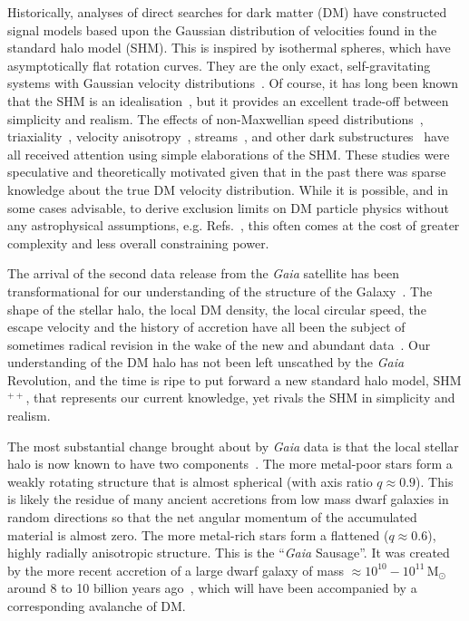 \documentclass[prd,10pt,twocolumn,showpacs,nofootinbib, aps,superscriptaddress,preprintnumbers]{revtex4-1}
\newcommand{\Msol}{\, \textrm{M}_\odot}
\begin{document}
Historically, analyses of direct searches for dark matter (DM) have
constructed signal models based upon the Gaussian distribution of
velocities found in the standard halo model (SHM). This is inspired by isothermal
spheres, which have asymptotically flat rotation curves. They are the
only exact, self-gravitating systems with Gaussian velocity
distributions~\cite{Chandra}. Of course, it has long been known that
the SHM is an
idealisation~\cite{Ev06,Vogelsberger:2008qb,Ze09,Ku10,Mao:2013nda},
but it provides an excellent trade-off between simplicity and
realism. The effects of non-Maxwellian speed
distributions~\cite{Kuhlen:2009vh,Ling:2009eh,Mao:2012hf},
triaxiality~\cite{Ca00}, velocity
anisotropy~\cite{Fairbairn:2008gz,Knirck:2018knd,MarchRussell:2008dy,Bozorgnia:2013pua,Fornasa:2013iaa},
streams~\cite{Savage:2006qr,Lee:2012pf,Purcell:2012sh,O'Hare:2014oxa,OHare:2017yze,Foster:2017hbq},
and other dark
substructures~\cite{Bruch:2008rx,Lisanti:2010qx,Lisanti:2011as,Billard:2012qu,Kavanagh:2016xfi}
have all received attention using simple elaborations of the
SHM. These studies were speculative and theoretically motivated given
that in the past there was sparse knowledge about the true DM velocity
distribution. While it is possible, and in some cases advisable, to
derive exclusion limits on DM particle physics without any
astrophysical assumptions, e.g. Refs.~\cite{Fox:2010bz, McCabe:2011sr,
  Frandsen:2011gi, Gondolo:2012rs, HerreroGarcia:2012fu,
  Frandsen:2013cna, Bozorgnia:2013hsa, Feldstein:2014gza,
  Fox:2014kua,Feldstein:2014ufa, Anderson:2015xaa,
  Gelmini:2016pei,Kahlhoefer:2016eds,Gondolo:2017jro,Gelmini:2017aqe,Ibarra:2017mzt,Fowlie:2017ufs},
this often comes at the cost of greater complexity and less
overall constraining power.

The arrival of the second data release from the {\it Gaia}
satellite has been transformational for our understanding of the
structure of the Galaxy~\cite{GaiaDR2}. The shape of the stellar halo,
the local DM density, the local circular speed, the escape velocity
and the history of accretion have all been the subject of sometimes
radical revision in the wake of the new and abundant
data~\cite{Lancaster:2018,We18,Be18}. Our understanding of the DM
halo has not been left unscathed by the \emph{Gaia} Revolution, and
the time is ripe to put forward a new standard halo model, SHM$^{++}$,
that represents our current knowledge, yet rivals the SHM in
simplicity and realism.

The most substantial change brought about by \emph{Gaia} data is that
the local stellar halo is now known to have two
components~\cite{Ca07,My18,Be18,Ma18}. The more metal-poor stars form
a weakly rotating structure that is almost spherical (with axis ratio
$q \approx 0.9$). This is likely the residue of many ancient
accretions from low mass dwarf galaxies in random directions so that
the net angular momentum of the accumulated material is almost
zero. The more metal-rich stars form a flattened ($q \approx 0.6$),
highly radially anisotropic structure. This is the ``\emph{Gaia}
Sausage''. It was created by the more recent accretion of a large
dwarf galaxy of mass $\approx 10^{10} - 10^{11} \Msol$ around 8 to 10 billion
years ago~\citep{Be18,He18,Kr18}, which will have been accompanied by
a corresponding avalanche of DM.
\end{document}

